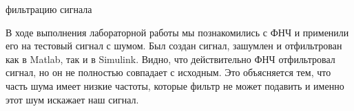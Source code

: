 \documentclass[a4paper,12pt]{article}
\begin{document}
\begin{enumerate}
{ фильтрацию сигнала
\\}

{\bfseries{}}

В ходе выполнения лабораторной работы мы познакомились с ФНЧ и применили его на тестовый сигнал с шумом. Был создан сигнал, зашумлен и отфильтрован как в Matlab, так и в Simulink. Видно, что действительно ФНЧ отфильтровал сигнал, но он не полностью совпадает с исходным. Это объясняется тем, что часть шума имеет низкие частоты, которые фильтр не может подавить и именно этот шум искажает наш сигнал.

\end{enumerate}
\end{document}
